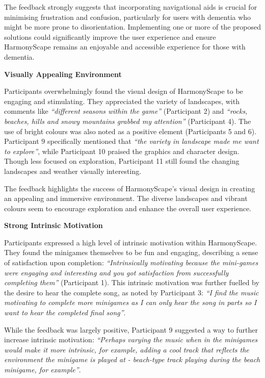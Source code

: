 \documentclass{l4proj}
\begin{document}
The feedback strongly suggests that incorporating navigational aids is crucial for minimising frustration and confusion, particularly for users with dementia who might be more prone to disorientation. Implementing one or more of the proposed solutions could significantly improve the user experience and ensure HarmonyScape remains an enjoyable and accessible experience for those with dementia.
\newline

\textbf{Visually Appealing Environment}

Participants overwhelmingly found the visual design of HarmonyScape to be engaging and stimulating. They appreciated the variety of landscapes, with comments like \emph{“different seasons within the game”} (Participant 2) and \emph{“rocks, beaches, hills and snowy mountains grabbed my attention”} (Participant 4). The use of bright colours was also noted as a positive element (Participants 5 and 6).  Participant 9 specifically mentioned that \emph{“the variety in landscape made me want to explore”}, while Participant 10 praised the graphics and character design. Though less focused on exploration, Participant 11 still found the changing landscapes and weather visually interesting.

The feedback highlights the success of HarmonyScape's visual design in creating an appealing and immersive environment. The diverse landscapes and vibrant colours seem to encourage exploration and enhance the overall user experience.
\newline

\textbf{Strong Intrinsic Motivation}

Participants expressed a high level of intrinsic motivation within HarmonyScape. They found the minigames themselves to be fun and engaging, describing a sense of satisfaction upon completion: \emph{“Intrinsically motivating because the mini-games were engaging and interesting and you got satisfaction from successfully completing them”} (Participant 1). This intrinsic motivation was further fuelled by the desire to hear the complete song, as noted by Participant 3: \emph{“I find the music motivating to complete more minigames as I can only hear the song in parts so I want to hear the completed final song”}.

While the feedback was largely positive, Participant 9 suggested a way to further increase intrinsic motivation: \emph{“Perhaps varying the music when in the minigames would make it more intrinsic, for example, adding a cool track that reflects the environment the minigame is played at - beach-type track playing during the beach minigame, for example”}.
\end{document}
